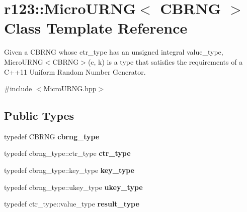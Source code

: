 \hypertarget{classr123_1_1MicroURNG}{}\section{r123\+:\+:Micro\+U\+R\+NG$<$ C\+B\+R\+NG $>$ Class Template Reference}
\label{classr123_1_1MicroURNG}


Given a C\+B\+R\+NG whose ctr\+\_\+type has an unsigned integral value\+\_\+type, Micro\+U\+R\+N\+G$<$\+C\+B\+R\+N\+G$>$(c, k) is a type that satisfies the requirements of a C++11 Uniform Random Number Generator.  




{\ttfamily \#include $<$Micro\+U\+R\+N\+G.\+hpp$>$}

\subsection*{Public Types}
\begin{DoxyCompactItemize}
\item 
\hypertarget{classr123_1_1MicroURNG_ab0b3a77c9408dbcb2f9d6b5c67e9c3f7}{}\label{classr123_1_1MicroURNG_ab0b3a77c9408dbcb2f9d6b5c67e9c3f7} 
typedef C\+B\+R\+NG {\bfseries cbrng\+\_\+type}
\item 
\hypertarget{classr123_1_1MicroURNG_a5aba882fd21e4d8f1a445f546e1e4476}{}\label{classr123_1_1MicroURNG_a5aba882fd21e4d8f1a445f546e1e4476} 
typedef cbrng\+\_\+type\+::ctr\+\_\+type {\bfseries ctr\+\_\+type}
\item 
\hypertarget{classr123_1_1MicroURNG_aef90e6157f360434342ad0df4ce5f364}{}\label{classr123_1_1MicroURNG_aef90e6157f360434342ad0df4ce5f364} 
typedef cbrng\+\_\+type\+::key\+\_\+type {\bfseries key\+\_\+type}
\item 
\hypertarget{classr123_1_1MicroURNG_a7e6fd93fec2fe138ee36b401ff376cfc}{}\label{classr123_1_1MicroURNG_a7e6fd93fec2fe138ee36b401ff376cfc} 
typedef cbrng\+\_\+type\+::ukey\+\_\+type {\bfseries ukey\+\_\+type}
\item 
\hypertarget{classr123_1_1MicroURNG_a512957c3e7b3d22741ef0a436b973c2b}{}\label{classr123_1_1MicroURNG_a512957c3e7b3d22741ef0a436b973c2b} 
typedef ctr\+\_\+type\+::value\+\_\+type {\bfseries result\+\_\+type}
\end{DoxyCompactItemize}

